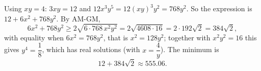 Using $xy=4$: $3xy=12$ and $12x^3y^5=12(xy)^3y^2=768y^2$. So the expression is $12+6x^2+768y^2$. By AM-GM,
\[
6x^2+768y^2\ge2\sqrt{6\cdot768\,x^2y^2}=2\sqrt{4608\cdot16}=2\cdot192\sqrt2=384\sqrt2,
\]
with equality when $6x^2=768y^2$, that is $x^2=128y^2$; together with $x^2y^2=16$ this gives $y^4=\dfrac{1}{8}$, which has real solutions (with $x=\dfrac{4}{y}$). The minimum is
\[
\boxed{12+384\sqrt2}\approx555.06 .
\]
